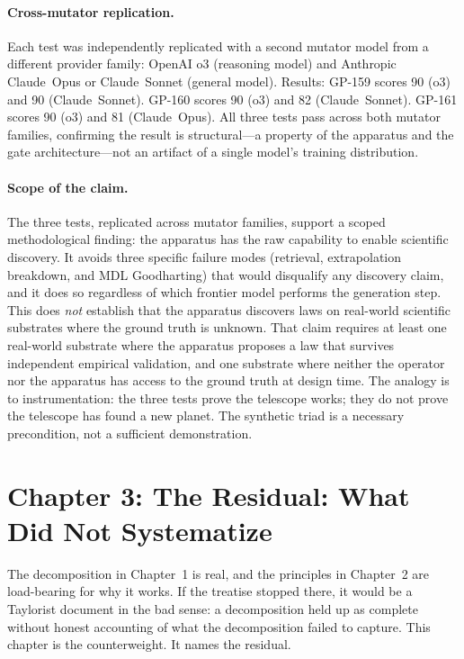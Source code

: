 \documentclass[11pt]{article}
\begin{document}
\paragraph{Cross-mutator replication.} Each test was independently replicated with a second mutator model from a different provider family: OpenAI o3 (reasoning model) and Anthropic Claude~Opus or Claude~Sonnet (general model). Results: GP-159 scores 90 (o3) and 90 (Claude~Sonnet). GP-160 scores 90 (o3) and 82 (Claude~Sonnet). GP-161 scores 90 (o3) and 81 (Claude~Opus). All three tests pass across both mutator families, confirming the result is structural---a property of the apparatus and the gate architecture---not an artifact of a single model's training distribution.

\paragraph{Scope of the claim.} The three tests, replicated across mutator families, support a scoped methodological finding: the apparatus has the raw capability to enable scientific discovery. It avoids three specific failure modes (retrieval, extrapolation breakdown, and MDL Goodharting) that would disqualify any discovery claim, and it does so regardless of which frontier model performs the generation step. This does \emph{not} establish that the apparatus discovers laws on real-world scientific substrates where the ground truth is unknown. That claim requires at least one real-world substrate where the apparatus proposes a law that survives independent empirical validation, and one substrate where neither the operator nor the apparatus has access to the ground truth at design time. The analogy is to instrumentation: the three tests prove the telescope works; they do not prove the telescope has found a new planet. The synthetic triad is a necessary precondition, not a sufficient demonstration.

\section{Chapter 3: The Residual: What Did Not Systematize}

The decomposition in Chapter~1 is real, and the principles in Chapter~2 are load-bearing for why it works. If the treatise stopped there, it would be a Taylorist document in the bad sense: a decomposition held up as complete without honest accounting of what the decomposition failed to capture. This chapter is the counterweight. It names the residual.
\end{document}
